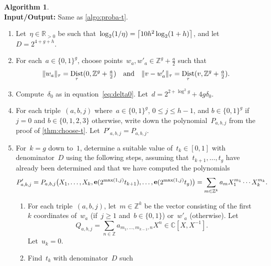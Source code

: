 \documentclass[12pt,oneside]{amsart}
\numberwithin{equation}{section}
\theoremstyle{definition}
\newtheorem{algorithm}[equation]{Algorithm}
\newcommand{\Z}{\mathbb{Z}}
\newcommand{\R}{\mathbb{R}}
\newcommand{\C}{\mathbb{C}}
\DeclareMathOperator{\Dist}{Dist}
\DeclareMathOperator{\e}{\mathbf{e}}
\DeclarePairedDelimiter{\paren}{(}{)}
\DeclarePairedDelimiter{\norm}{\|}{\|}
\DeclarePairedDelimiter{\ceil}{\lceil}{\rceil}
\begin{document}
\begin{algorithm}
  \label{algo:deterministic-t}~\\
  \textbf{Input/Output:} Same as \cref{algo:proba-t}.
  \begin{enumerate}
  \item \label{step:deterministic-t-eta} Let~$\eta\in \R_{>0}$ be such
    that~$\log_2(1/\eta) = \ceil[\big]{10 h^2 \log_2(1+h)}$, and
    let~$D = 2^{4 + g + h}$.
  \item \label{step:deterministic-t-closest} For each~$a\in \{0,1\}^g$, choose
    points~$w_a,w'_a\in \Z^g + \tfrac a2$ such that
    \begin{displaymath}
      \norm{w_a}_\tau = \Dist_\tau(0, \Z^g + \tfrac a2) \quad\text{and}\quad
      \norm{v - w'_a}_\tau = \Dist_\tau(v, \Z^g + \tfrac a2).
    \end{displaymath}
  \item \label{step:deterministic-d-delta} Compute~$\delta_0$ as in
    equation~\eqref{eq:delta0}.  Let~$d = 2^{2+\log^2 g} + 4g\delta_0$.
  \item \label{step:deterministic-polys} For each triple~$(a,b,j)$
    where~$a\in \{0,1\}^g$, $0\leq j\leq h-1$, and $b\in \{0,1\}^g$ if~$j=0$
    and $b\in \{0,1,2,3\}$ otherwise, write down the polynomial~$P_{a,b,j}$
    from the proof of \cref{thm:choose-t}. Let~$P'_{a,b,j} = P_{a,b,j}$.
  \item \label{step:deterministic-tk} For~$k=g$ down to~$1$, determine a
    suitable value of~$t_k\in [0,1]$ with denominator~$D$ using the following
    steps, assuming that~$t_{k+1},\ldots,t_g$ have already been determined and
    that we have computed the polynomials
    \begin{displaymath}
      P'_{a,b,j} = P_{a,b,j}\paren[\big]{X_1,\ldots,X_k, \e(2^{\max(1,j)}t_{k+1}),\ldots, \e(2^{\max(1,j)}t_g)}
      = \sum_{m\in \Z^k} a_m X_1^{m_1}\cdots X_k^{m_k}.
    \end{displaymath}
    \begin{enumerate}
    \item For each triple~$(a,b,j)$, let~$m\in \Z^k$ be the vector consisting
      of the first~$k$ coordinates of~$w_a$ (if~$j\geq 1$ and~$b\in\{0,1\}$)
      or~$w'_a$ (otherwise). Let
      \begin{displaymath}
        Q_{a,b,j} = \sum_{n\in \Z} a_{m_1,\ldots,m_{k-1},n} X^n \in \C[X,X^{-1}].
      \end{displaymath}
      Let~$u_k = 0$.
    \item Find~$t_k$ with denominator~$D$ such

\end{enumerate}
\end{enumerate}
\end{algorithm}
\end{document}
